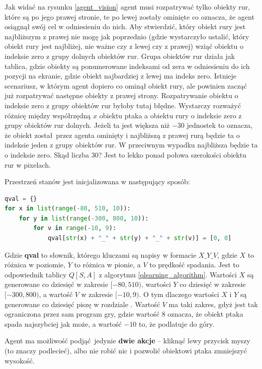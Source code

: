 \documentclass[a4paper, 12pt,oneside]{book}
\begin{document}
Jak widać na rysunku \ref{agent_vision} agent musi rozpatrywać tylko obiekty
rur, które są po jego prawej stronie, te po lewej zostały ominięte co oznacza,
że agent osiągnął swój cel w odniesieniu do nich. Aby stwierdzić, który obiekt
rury jest najbliższym z prawej nie mogę jak poprzednio (gdzie wystarczyło
ustalić, który obiekt rury jest najbliżej, nie ważne czy z lewej czy z prawej)
wziąć obiektu o indeksie zero z grupy dolnych obiektów rur. Grupa
obiektów rur działa jak tablica, gdzie obiekty są ponumerowane indeksami od
zera w odniesieniu do ich pozycji na ekranie, gdzie obiekt najbardziej z lewej
ma indeks zero. Istnieje scenariusz, w którym agent dopiero co ominął obiekt
rury, ale powinien zacząć już rozpatrywać następne obiekty z prawej strony.
Rozpatrywanie obiektu o indeksie zero z grupy obiektów rur byłoby tutaj błędne.
Wystarczy rozważyć różnicę między współrzędną $x$ obiektu ptaka a obiektu rury
o indeksie zero z grupy obiektów rur dolnych. Jeżeli ta jest większa niż $-30$
jednostek to oznacza, że obiekt został przez agenta ominięty i najbliższą z
prawej rurą będzie ta o indeksie jeden z grupy obiektów rur. W przeciwnym
wypadku najbliższa będzie ta o indeksie zero. Skąd liczba $30$? Jest to lekko
ponad połowa szerokości obiektu rur w pixelach.

Przestrzeń stanów jest inicjalizowana w następujący sposób:
\begin{lstlisting}[language=Python, label={qval_init}, caption={Inicjalizacja
Q-Values.}, captionpos=t]
qval = {}
for x in list(range(-80, 510, 10)):
    for y in list(range(-300, 800, 10)):
        for v in range(-10, 9):
            qval[str(x) + "_" + str(y) + "_" + str(v)] = [0, 0]
\end{lstlisting}
Gdzie \textbf{qval} to słownik, którego kluczami są napisy w formacie
$X\_Y\_V$, gdzie $X$ to różnica w poziomie, $Y$ to różnica w pionie, a $V$ to
prędkość spadania. Jest to odpowiednik tablicy $Q[S,A]$ z algorytmu
\ref{qlearning_algorithm}. Wartości $X$ są generowane co dziesięć w zakresie
$[-80,510)$, wartości $Y$ co dziesięć w zakresie $[-300,800)$, a wartość $V$ w
zakresie $[-10,9)$. O tym dlaczego wartości $X$ i $Y$ są generowane co dziesięć
piszę w rozdziale . Wartość $V$ ma taki zakres, gdyż
jest tak ograniczona przez sam program gry, gdzie wartość $8$ oznacza, że
obiekt ptaka spada najszybciej jak może, a wartość $-10$ to, że podlatuje do
góry.

Agent ma możliwość podjąć jedynie \textbf{dwie akcje} -- kliknąć lewy przycisk
myszy (to znaczy podlecieć), albo nie robić nic i pozwolić obiektowi ptaka
zmniejszyć wysokość.
\end{document}
